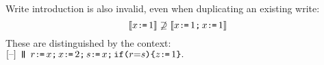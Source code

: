 
Write introduction is also invalid, even when duplicating an existing write:
\begin{displaymath}
  \llbracket x \texttt{:}\mkern-1mu\texttt{=}\, 1\rrbracket 
  \not\supseteq
  \llbracket x \texttt{:}\mkern-1mu\texttt{=}\, 1 \texttt{;}\,\allowbreak x \texttt{:}\mkern-1mu\texttt{=}\, 1\rrbracket
\end{displaymath}
These are distinguished by the context:
\begin{math}
  \hole{} \PAR
  r\GETS x \SEMI
  x\GETS2 \SEMI
  s\GETS x\SEMI
  \IF{\aReg {=} \bReg} \THEN \cLoc \GETS 1 \FI.
\end{math}










